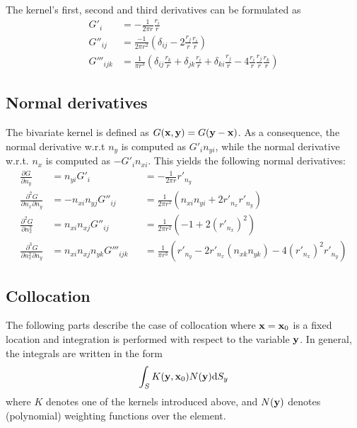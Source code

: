 \documentclass[a4paper,11pt]{article}
\newcommand{\td}{\mathrm{d}}
\begin{document}
The kernel's first, second and third derivatives can be formulated as
%
\begin{align}
	G'_{i}
	&= -\frac{1}{2\pi r} \frac{r_i}{r}
	\label{eq:laplace_gradient}
	\\
	G''_{ij}
	&= \frac{-1}{2\pi r^2}\left( \delta_{ij} - 2\frac{r_j}{r} \frac{r_i}{r}\right)
	\label{eq:laplace_second_derivative}
	\\
	G'''_{ijk}
	&= \frac{1}{\pi r^3} \left(
	\delta_{ij} \frac{r_k}{r}
	+ \delta_{jk} \frac{r_i}{r}
	+ \delta_{ki} \frac{r_j}{r}
	-4 \frac{r_i}{r} \frac{r_j}{r} \frac{r_k}{r}
	\right)
	\label{eq:laplace_third_derivative}
\end{align}

\subsection{Normal derivatives}

The bivariate kernel is defined as $G({\bf x}, {\bf y}) = G({\bf y}-{\bf x})$.
As a consequence, the normal derivative w.r.t $n_y$ is computed as $G'_i n_{yi}$, while the normal derivative w.r.t. $n_x$ is computed as $-G'_i n_{xi}$.
This yields the following normal derivatives:
%
\begin{align}
	\frac{\partial G}{\partial n_y} 
	&= n_{yi} G'_i
	&&
	= -\frac{1}{2\pi r} r'_{n_y}
	\\
	\frac{\partial^2 G}{\partial n_x \partial n_y}
	&= -n_{xi} n_{yj} G''_{ij}
	&&
	= \frac{1}{2\pi r^2}\left( n_{xi} n_{yi} + 2 r'_{n_x} r'_{n_y}\right)
	\\
	\frac{\partial^2 G}{\partial n_x^2}
	&= n_{xi} n_{xj} G''_{ij}
	&&
	= \frac{1}{2\pi r^2}\left( -1 + 2 \left(r'_{n_x}\right)^2 \right)
	\\
	\frac{\partial^3 G}{\partial n_x^2 \partial n_y}
	&= n_{xi} n_{xj} n_{yk} G'''_{ijk}
	&&
	= \frac{1}{\pi r^3} 
	 \left(
	r'_{n_y}
	- 2 r'_{n_x} \left(n_{xk} n_{yk}\right)
	-4 \left(r'_{n_x}\right)^2 r'_{n_y}
	\right)
\end{align}

\subsection{Collocation}

The following parts describe the case of collocation where ${\bf x}={\bf x}_0$ is a fixed location and integration is performed with respect to the variable ${\bf y}$. In general, the integrals are written in the form
%
\begin{equation}
\int_S K({\bf y}, {\bf x}_0) N({\bf y}) \td S_y
\end{equation}
%
where $K$ denotes one of the kernels introduced above, and $N({\bf y})$ denotes (polynomial) weighting functions over the element.
\end{document}
